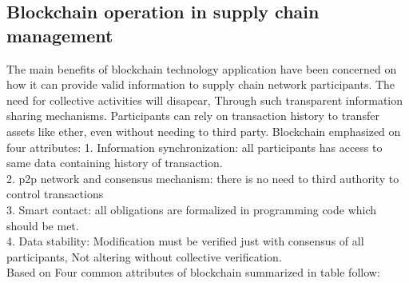 \subsection{Blockchain operation in supply chain management}
The main benefits of blockchain technology application have been concerned on how it can
provide valid information to supply chain network participants.  The need for collective activities will disapear, Through such transparent  information sharing mechanisms.
Participants can rely on transaction history to transfer assets like ether, even without needing to third party\cite{Nina}.
Blockchain emphasized on four attributes:
1. Information synchronization: all participants has access to same data containing history of transaction.\\
2. p2p network and consensus mechanism: there is no need to third authority to control transactions\\
3. Smart contact: all obligations are formalized in programming code which should be met.\\
4. Data stability: Modification must be verified just with consensus of all participants, Not altering without collective verification\cite{Nina}. \\
Based on Four common attributes of blockchain
 summarized in table follow:\\
